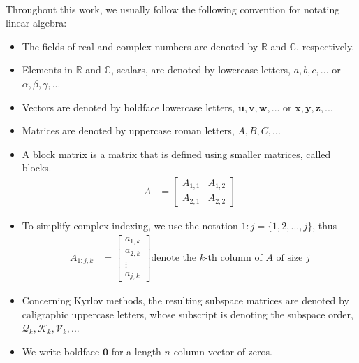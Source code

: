 \paragraph*{}
Throughout this work, we usually follow the following convention for notating linear
algebra:
\begin{itemize}
    \item The fields of real and complex numbers are denoted by $\mathbb{R}$ and $\mathbb{C}$, respectively.
    \item  Elements in $\mathbb{R}$ and $\mathbb{C}$, scalars, are denoted by lowercase letters, $a, b, c, ...$ or $\alpha, \beta, \gamma, ...$
    \item Vectors are denoted by boldface lowercase letters, $\mathbf{u}, \mathbf{v}, \mathbf{w}, ...$ or $\mathbf{x}, \mathbf{y}, \mathbf{z}, ...$
    \item Matrices are denoted by uppercase roman letters, $A, B, C, ...$
    \item A block matrix is a matrix that is defined using smaller matrices, called blocks.
    \begin{align*}
        A &= \begin{bmatrix}
                A_{1,1} & A_{1,2}\\
                A_{2,1} & A_{2,2}
            \end{bmatrix}
    \end{align*}
        
    \item To simplify complex indexing, we use the notation $1:j = \{1,2,...,j\}$, thus
        \begin{align*}
        A_{1:j,k} &=
            \begin{bmatrix}
               a_{1,k} \\
               a_{2,k} \\
               \vdots \\
               a_{j,k}
            \end{bmatrix}
        \text{denote the $k$-th column of $A$ of size $j$}
        \end{align*} 

\item Concerning Kyrlov methods, the resulting subspace matrices are denoted by caligraphic uppercase letters, whose subscript is denoting the subspace order, $\mathcal{Q}_k, \mathcal{K}_k, \mathcal{V}_k,...$
\item We write boldface $\mathbf{0}$ for a length $n$ column vector of zeros.
\end{itemize}

